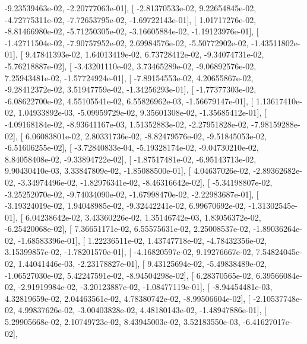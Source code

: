 \documentclass{article}
\begin{document}
         -9.23539463e-02,  -2.20777063e-01],
       [ -2.81370533e-02,   9.22654845e-02,  -4.72775311e-02,
         -7.72653795e-02,  -1.69722143e-01],
       [  1.01717276e-02,  -8.81466980e-02,  -5.71250305e-02,
         -3.16605884e-02,  -1.19123976e-01],
       [ -1.42711504e-02,  -7.90757952e-02,   2.69984576e-02,
         -5.50772902e-02,  -1.43511802e-01],
       [  9.47841393e-02,   1.64013419e-02,   6.73728412e-02,
         -9.34074731e-02,  -5.76218887e-02],
       [ -3.43201110e-02,   3.73465289e-02,  -9.06892576e-02,
          7.25943481e-02,  -1.57724924e-01],
       [ -7.89154553e-02,   4.20655867e-02,  -9.28412372e-02,
          3.51947759e-02,  -1.34256293e-01],
       [ -1.77377303e-02,  -6.08622700e-02,   4.55105541e-02,
          6.55826962e-03,  -1.56679147e-01],
       [  1.13617410e-02,   1.04933892e-03,  -5.09959729e-02,
          9.35601308e-02,  -1.35685412e-01],
       [ -4.09168184e-02,  -8.93641167e-03,   1.51352883e-02,
         -2.27951828e-02,  -7.98159288e-02],
       [  6.06083801e-02,   2.80331736e-02,  -8.82479576e-02,
         -9.51845053e-02,  -6.51606255e-02],
       [ -3.72840833e-04,  -5.19328174e-02,  -9.04730210e-02,
          8.84058408e-02,  -9.33894722e-02],
       [ -1.87517481e-02,  -6.95143713e-02,   9.90430410e-03,
          3.33847809e-02,  -1.85088500e-01],
       [  4.04637026e-02,  -2.89362682e-02,  -3.34974496e-02,
         -1.82976341e-02,  -8.46316642e-02],
       [ -5.34198807e-02,  -3.25252070e-02,  -9.74034090e-02,
         -1.67998470e-02,  -2.22983687e-01],
       [ -3.19324019e-02,   1.94048985e-02,  -9.32442241e-02,
          6.99670692e-02,  -1.31302545e-01],
       [  6.04238642e-02,   3.43360226e-02,   1.35146742e-03,
          1.83056372e-02,  -6.25420068e-02],
       [  7.36651171e-02,   6.55575631e-02,   2.25008537e-02,
         -1.89036264e-02,  -1.68583396e-01],
       [  1.22236511e-02,   1.43747718e-02,  -4.78432356e-02,
          3.15399857e-02,  -1.78201570e-01],
       [ -4.16820597e-02,   9.19276667e-02,   7.54824045e-02,
          1.44041446e-03,  -2.23178827e-01],
       [  9.43125694e-02,  -5.49838489e-02,  -1.06527030e-02,
          5.42247591e-02,  -8.94504298e-02],
       [  6.28370565e-02,   6.39566084e-02,  -2.91919984e-02,
         -3.20123887e-02,  -1.08477119e-01],
       [ -8.94454481e-03,   4.32819659e-02,   2.04463561e-02,
          4.78380742e-02,  -8.99506604e-02],
       [ -2.10537748e-02,   4.99837626e-02,  -3.00403828e-02,
          4.48180143e-02,  -1.48947886e-01],
       [  5.29905668e-02,   2.10749723e-02,   8.43945003e-02,
          3.52183550e-03,  -6.41627017e-02],
\end{document}
